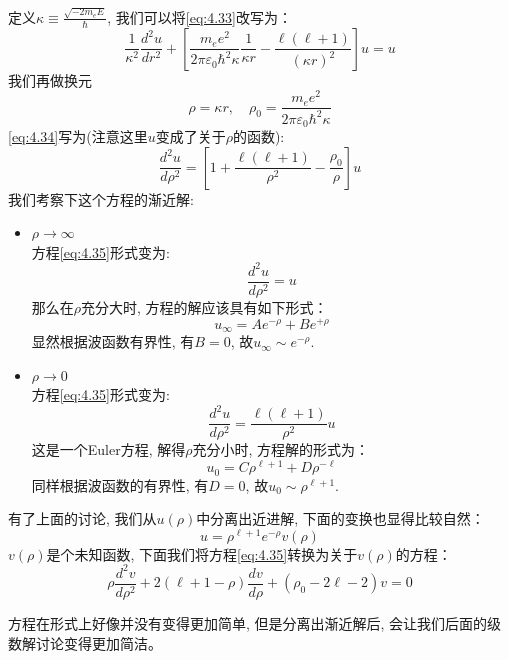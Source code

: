 \documentclass[a4paper,zihao=-4,linespread=1]{ctexrep}
\begin{document}
    定义$\kappa\equiv\frac{\sqrt{-2m_eE}}{\hbar}$, 我们可以将\ref{eq:4.33}改写为：
    \begin{equation}
        \label{eq:4.34}
        \frac{1}{\kappa^2}\frac{d^2u}{dr^2}+\left[\frac{m_ee^2}{2\pi\varepsilon_0\hbar^2\kappa}\frac{1}{\kappa r}-\frac{\ell\left(\ell+1\right)}{\left(\kappa r\right)^2}\right]u=u
    \end{equation}
    我们再做换元\[\rho=\kappa r,\quad \rho_0=\frac{m_ee^2}{2\pi\varepsilon_0\hbar^2\kappa}\]
    \ref{eq:4.34}写为(注意这里$u$变成了关于$\rho$的函数):
    \begin{equation}
        \label{eq:4.35}
        \frac{d^2u}{d\rho^2}=\left[1+\frac{\ell\left(\ell+1\right)}{\rho^2}-\frac{\rho_0}{\rho}\right]u
    \end{equation}
    我们考察下这个方程的渐近解:
    \begin{itemize}
        \item $\rho\to\infty$\\
                方程\ref{eq:4.35}形式变为:
                \[\frac{d^2u}{d\rho^2}=u\]
                那么在$\rho $充分大时, 方程的解应该具有如下形式：\[u_\infty=Ae^{-\rho}+Be^{+\rho}\]
                显然根据波函数有界性, 有$B=0$, 故$u_\infty\sim e^{-\rho}$.
        \item $\rho\to 0$\\
                方程\ref{eq:4.35}形式变为:
                \[\frac{d^2u}{d\rho^2}=\frac{\ell\left(\ell+1\right)}{\rho^2}u\]
                这是一个Euler方程, 解得$\rho$充分小时, 方程解的形式为：\[u_0=C\rho^{\ell+1}+D\rho^{-\ell}\]
                同样根据波函数的有界性, 有$D=0$, 故$u_0\sim \rho^{\ell+1}$.
    \end{itemize}
    
    有了上面的讨论, 我们从$u(\rho)$中分离出近进解, 下面的变换也显得比较自然：
    \[u=\rho^{\ell+1}e^{-\rho}v(\rho)\]
    $v(\rho)$是个未知函数, 下面我们将方程\ref{eq:4.35}转换为关于$v(\rho)$的方程：
    \begin{equation}
        \label{eq:4.36}
        \rho\frac{d^2v}{d\rho^2}+2\left(\ell+1-\rho\right)\frac{dv}{d\rho}+\left(\rho_0-2\ell-2\right)v=0
    \end{equation}
    
    方程在形式上好像并没有变得更加简单, 但是分离出渐近解后, 会让我们后面的级数解讨论变得更加简洁。
    
\end{document}
